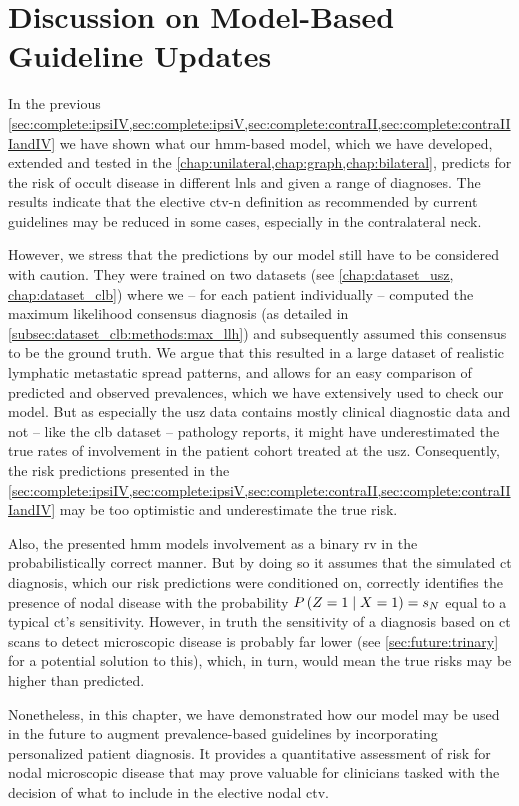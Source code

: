 \documentclass[\relativeRoot/main.tex]{subfiles}
\begin{document}
\section[Discussion on Model-Based Guideline Updates]{Discussion on Model-Based\\Guideline Updates}
\label{sec:complete:dicussion}

In the previous \cref{sec:complete:ipsiIV,sec:complete:ipsiV,sec:complete:contraII,sec:complete:contraIIIandIV} we have shown what our \gls{hmm}-based model, which we have developed, extended and tested in the \cref{chap:unilateral,chap:graph,chap:bilateral}, predicts for the risk of occult disease in different \glspl{lnl} and given a range of diagnoses. The results indicate that the elective \gls{ctv-n} definition as recommended by current guidelines \cite{gregoire_delineation_2014,biau_selection_2019} may be reduced in some cases, especially in the contralateral neck.

However, we stress that the predictions by our model still have to be considered with caution. They were trained on two datasets (see \cref{chap:dataset_usz, chap:dataset_clb}) where we -- for each patient individually -- computed the maximum likelihood consensus diagnosis (as detailed in \cref{subsec:dataset_clb:methods:max_llh}) and subsequently assumed this consensus to be the ground truth. We argue that this resulted in a large dataset of realistic lymphatic metastatic spread patterns, and allows for an easy comparison of predicted and observed prevalences, which we have extensively used to check our model. But as especially the \gls{usz} data \cite{ludwig_detailed_2021} contains mostly clinical diagnostic data and not -- like the \gls{clb} dataset \cite{bauwens_prevalence_2021} -- pathology reports, it might have underestimated the true rates of involvement in the patient cohort treated at the \gls{usz}. Consequently, the risk predictions presented in the \cref{sec:complete:ipsiIV,sec:complete:ipsiV,sec:complete:contraII,sec:complete:contraIIIandIV} may be too optimistic and underestimate the true risk.

Also, the presented \gls{hmm} models involvement as a binary \acrfull{rv} in the probabilistically correct manner. But by doing so it assumes that the simulated \gls{ct} diagnosis, which our risk predictions were conditioned on, correctly identifies the presence of nodal disease with the probability $P \left( Z=1 \mid X=1 \right) = s_N$ equal to a typical \gls{ct}'s sensitivity. However, in truth the sensitivity of a diagnosis based on \gls{ct} scans to detect microscopic disease is probably far lower (see \cref{sec:future:trinary} for a potential solution to this), which, in turn, would mean the true risks may be higher than predicted.

Nonetheless, in this chapter, we have demonstrated how our model may be used in the future to augment prevalence-based guidelines by incorporating personalized patient diagnosis. It provides a quantitative assessment of risk for nodal microscopic disease that may prove valuable for clinicians tasked with the decision of what to include in the elective nodal \gls{ctv}.
\end{document}
